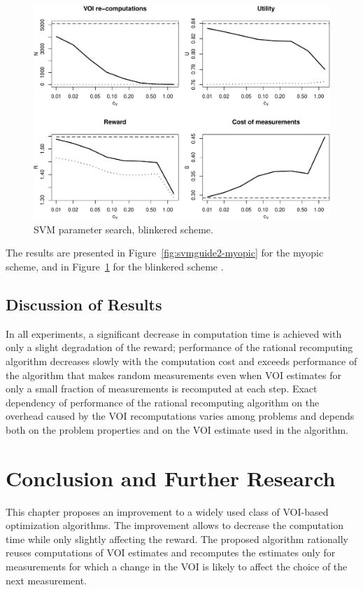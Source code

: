 \begin{figure}[h]
\centering
\includegraphics[scale=0.63]{svmguide2-blinkered.pdf}
\caption{SVM parameter search, blinkered scheme.}
\label{fig:svmguide2-blinkered}
\end{figure}
The results are presented in Figure~\ref{fig:svmguide2-myopic} for the
myopic scheme, and in Figure~\ref{fig:svmguide2-blinkered} for the
blinkered scheme \cite{TolpinShimony.blinkered}.

\subsection{Discussion of Results}

In all experiments, a significant decrease in computation time is
achieved with only a slight degradation of the reward; performance of
the rational recomputing algorithm decreases slowly with the
computation cost and exceeds performance of the algorithm that
makes random measurements even when VOI estimates for only a small fraction of
measurements is recomputed at each step. Exact dependency of
performance of the rational recomputing algorithm on the
overhead caused by the VOI recomputations varies among problems and depends
both on the problem properties and on the VOI estimate used in the
algorithm.

\section{Conclusion and Further Research}
\label{sec:raticomp-conclusion}

This chapter proposes an improvement to a widely used class of VOI-based
optimization algorithms. The improvement allows to decrease the
computation time while only slightly affecting the reward. The
proposed algorithm rationally reuses computations of VOI estimates and
recomputes the estimates only for measurements for which a change in
the VOI is likely to affect the choice of the next
measurement.

